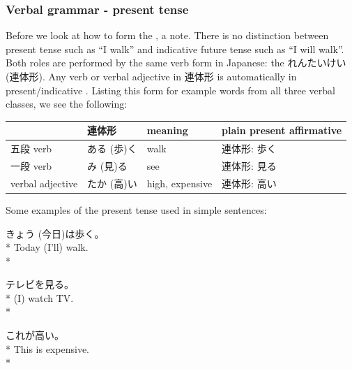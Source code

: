 \documentclass[11pt, b5paper, twoside, openright, onecolumn]{book}
\makeatletter
\newcommand*{\rtrubystack}[2]{{\relscale{0.5}%
  \begin{tabular}[b]{@{}c@{}}%
    {#1}\\%
    {\textscale{2}{#2}}%
  \end{tabular}}%
}
\DeclareRobustCommand*{\rtruby}[2]{%
  \mbox{%
    \setlength{\parskip}{0ex}%
    \BeginAccSupp{method=pdfstringdef,ActualText={#1}}%
      \rtrubystack{\phantom{#2}}{#1}%
      \llap{%
        \rtrubystack{#2}{\phantom{#1}}%
      }%
    \EndAccSupp{}%
  }%
}
\newcommand*{\rubystack}[2]{{\relscale{0.5}%
  \begin{tabular}[b]{@{}c@{}}%
    {#1}\\%
   {\textscale{2}{#2}}%
  \end{tabular}}%
}
\DeclareRobustCommand*{\ruby}[2]{%
  \mbox{%
    \setlength{\parskip}{0ex}%
    \BeginAccSupp{method=pdfstringdef,ActualText={#1}}%
      \rubystack{\phantom{#2}}{#1}%
      \llap{%
        \rubystack{#2}{\phantom{#1}}%
      }%
    \EndAccSupp{}%
  }%
}
\renewcommand*{\rtruby}[2]{#2 (#1)}%
\renewcommand*{\ruby}[2]{#2 (#1)}%
\newenvironment{exampleblock}{
\setlength{\parindent}{0.6in}
\begin{minipage}[t]{\dimexpr\textwidth-\parindent}}
{\end{minipage}}
\newenvironment{mytabular}[1]{\noindent\hspace{0.4in}
\begin{tabular}[h]{#1}}{\end{tabular}}
\makeatother
\begin{document}
\subsubsection{Verbal grammar - present tense}

Before we look at how to form the ‚ a note. There is no distinction between present tense such as “I walk” and indicative future tense such as “I will walk”. Both roles are performed by the same verb form in Japanese: the \ruby{連体形}{れんたいけい}. Any verb or verbal adjective in 連体形 is automatically in present/indicative . Listing this form for example words from all three verbal classes‚ we see the following:

\vspace{0.5cm}
\smaller
\begin{mytabular}{| l  l  l  l |}\hline 
\rule{0pt}{2.4ex} & 連体形 & meaning & plain present affirmative\\ 
\hline
\rule{0pt}{3.6ex}五段 verb & \rtruby{歩}{ある}く & walk & 連体形: 歩く\\ 
\rule{0pt}{3.6ex}一段 verb & \rtruby{見}{み}る & see & 連体形: 見る\\ 
\rule{0pt}{3.6ex}verbal adjective & \rtruby{高}{たか}い & high‚ expensive & 連体形: 高い\\ 
\hline 
\end{mytabular}
\larger
\vspace{0.5cm}


Some examples of the present tense used in simple sentences:

\vspace{0.4cm}
\begin{exampleblock}
\ruby{今日}{きょう}は歩く。 \\* 
Today (I’ll) walk. \\* 
\end{exampleblock}
\vspace{0.2cm}

\begin{exampleblock}
テレビを見る。 \\* 
(I) watch TV. \\* 
\end{exampleblock}
\vspace{0.2cm}

\begin{exampleblock}
これが高い。 \\* 
This is expensive. \\* 
\end{exampleblock}
\end{document}

